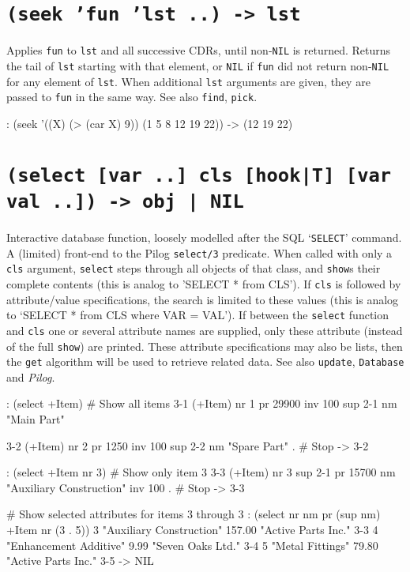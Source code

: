  
\section*{\texttt{(seek 'fun 'lst ..) -> lst}}
\label{sec:func-ref-S-(seek 'fun 'lst ..) -> lst}


Applies \texttt{fun} to \texttt{lst} and all successive CDRs, until non-\texttt{NIL} is
returned. Returns the tail of \texttt{lst} starting with that element, or \texttt{NIL}
if \texttt{fun} did not return non-\texttt{NIL} for any element of \texttt{lst}. When
additional \texttt{lst} arguments are given, they are passed to \texttt{fun} in the
same way. See also \texttt{find}, \texttt{pick}.


\begin{wideverbatim}
: (seek '((X) (> (car X) 9)) (1 5 8 12 19 22))
-> (12 19 22)
\end{wideverbatim}

 
\section*{\texttt{(select [var ..] cls [hook|T] [var val ..]) -> obj | NIL}}
\label{sec:func-ref-S-(select [var ..] cls [hook|T] [var val ..]) -> obj | NIL}


Interactive database function, loosely modelled after the SQL `\texttt{SELECT}'
command. A (limited) front-end to the Pilog \texttt{select/3} predicate. When
called with only a \texttt{cls} argument, \texttt{select} steps through all objects of
that class, and \texttt{show}s their complete contents (this is analog to 'SELECT * from CLS'). If \texttt{cls} is followed by attribute/value
specifications, the search is limited to these values (this is analog to
`SELECT * from CLS where VAR = VAL'). If between the \texttt{select} function
and \texttt{cls} one or several attribute names are supplied, only these
attribute (instead of the full \texttt{show}) are printed. These attribute
specifications may also be lists, then the \texttt{get} algorithm will be used
to retrieve related data. See also \texttt{update}, \texttt{Database} and
\emph{Pilog}.


\begin{wideverbatim}
: (select +Item)                       # Show all items
{3-1} (+Item)
   nr 1
   pr 29900
   inv 100
   sup {2-1}
   nm "Main Part"

{3-2} (+Item)
   nr 2
   pr 1250
   inv 100
   sup {2-2}
   nm "Spare Part"
.                                      # Stop
-> {3-2}

: (select +Item nr 3)                  # Show only item 3
{3-3} (+Item)
   nr 3
   sup {2-1}
   pr 15700
   nm "Auxiliary Construction"
   inv 100
.                                      # Stop
-> {3-3}

# Show selected attributes for items 3 through 3
: (select nr nm pr (sup nm) +Item nr (3 . 5))
3 "Auxiliary Construction" 157.00 "Active Parts Inc." {3-3}
4 "Enhancement Additive" 9.99 "Seven Oaks Ltd." {3-4}
5 "Metal Fittings" 79.80 "Active Parts Inc." {3-5}
-> NIL
\end{wideverbatim}

